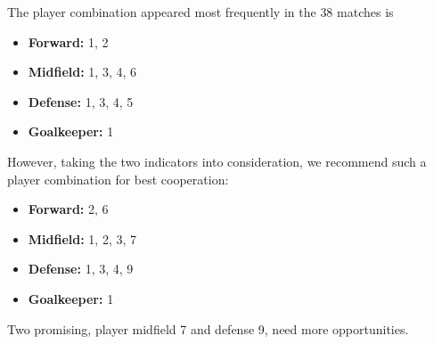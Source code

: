 \documentclass[12pt]{article}
\begin{document}
The player combination appeared most frequently in the $38$ matches is
\begin{itemize}
	\item \textbf{Forward:} 1, 2
	\item \textbf{Midfield:} 1, 3, 4, 6
	\item \textbf{Defense:} 1, 3, 4, 5
	\item \textbf{Goalkeeper:} 1
\end{itemize}
However, taking the two indicators into consideration, we recommend such a player combination for best cooperation:
\begin{itemize}
	\item \textbf{Forward:} 2, 6
	\item \textbf{Midfield:} 1, 2, 3, 7
	\item \textbf{Defense:} 1, 3, 4, 9
	\item \textbf{Goalkeeper:} 1
\end{itemize}
Two promising, player midfield 7 and defense 9, need more opportunities.
\end{document}
